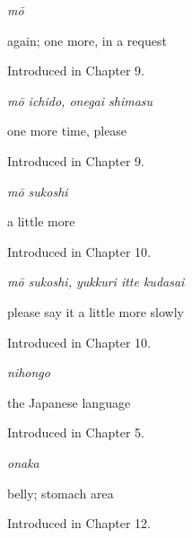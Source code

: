 \noindent\begin{minipage}[t]{\linewidth}
\raggedright
\textbf{}\enspace\emph{mō}\par
\small again; one more, in a request\par
\footnotesize Introduced in Chapter 9.
\end{minipage}\par\medskip

\noindent\begin{minipage}[t]{\linewidth}
\raggedright
\textbf{}\enspace\emph{mō ichido, onegai shimasu}\par
\small one more time, please\par
\footnotesize Introduced in Chapter 9.
\end{minipage}\par\medskip

\noindent\begin{minipage}[t]{\linewidth}
\raggedright
\textbf{}\enspace\emph{mō sukoshi}\par
\small a little more\par
\footnotesize Introduced in Chapter 10.
\end{minipage}\par\medskip

\noindent\begin{minipage}[t]{\linewidth}
\raggedright
\textbf{}\enspace\emph{mō sukoshi, yukkuri itte kudasai}\par
\small please say it a little more slowly\par
\footnotesize Introduced in Chapter 10.
\end{minipage}\par\medskip

\noindent\begin{minipage}[t]{\linewidth}
\raggedright
\textbf{}\enspace\emph{nihongo}\par
\small the Japanese language\par
\footnotesize Introduced in Chapter 5.
\end{minipage}\par\medskip

\noindent\begin{minipage}[t]{\linewidth}
\raggedright
\textbf{}\enspace\emph{onaka}\par
\small belly; stomach area\par
\footnotesize Introduced in Chapter 12.
\end{minipage}\par\medskip


